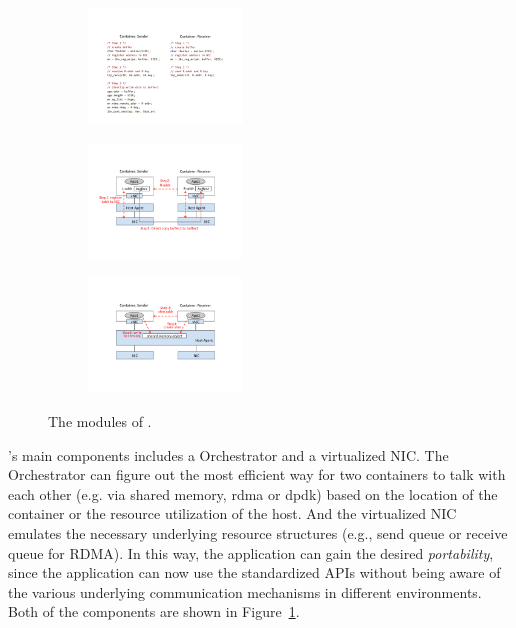      \begin{figure}[ht]
     \centering 
     \begin{subfigure}
     \centering 
     \includegraphics[width=0.45\textwidth]{figures/system/sys_rdma_code.pdf}
     \end{subfigure}
           
     \begin{subfigure}
     \centering 
     \includegraphics[width=0.45\textwidth]{figures/system/sys_rdma_rdma.pdf}      
     \end{subfigure}
     
     \begin{subfigure}
     \centering
     \includegraphics[width=0.45\textwidth]{figures/system/sys_rdma_shm.pdf}      
     \end{subfigure}
     \label{fig:system_modules}
     \caption{The modules of \sysname.} 
     \end{figure}

\sysname's main components includes a Orchestrator and a virtualized NIC.
The Orchestrator can figure out the most efficient way for two containers to talk with each other (e.g. 
via shared memory, rdma or dpdk) based on the location of the container or the resource
utilization of the host.
And the virtualized NIC emulates the necessary underlying resource structures 
(e.g., send queue or receive queue for RDMA). In this way, the application can
gain the desired \emph{portability}, since the application can now use the standardized  
APIs without being aware of the various underlying communication
mechanisms in different environments. 
Both of the components are shown in Figure~\ref{fig:system_modules}.

